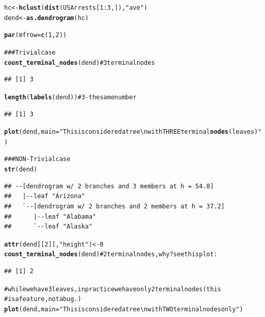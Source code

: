 \documentclass[shortnames,nojss,article]{jss}\usepackage{graphicx, color}
\makeatletter
\newcommand{\hlfunctioncall}[1]{\textcolor[rgb]{0.501960784313725,0,0.329411764705882}{\textbf{#1}}}%
\newcommand{\hlstring}[1]{\textcolor[rgb]{0.6,0.6,1}{#1}}%
\newcommand{\hlcomment}[1]{\textcolor[rgb]{0.180392156862745,0.6,0.341176470588235}{#1}}%
\newenvironment{kframe}{%
 \def\at@end@of@kframe{}%
 \ifinner\ifhmode%
  \def\at@end@of@kframe{\end{minipage}}%
  \begin{minipage}{\columnwidth}%
 \fi\fi%
 \def\FrameCommand##1{\hskip\@totalleftmargin \hskip-\fboxsep
 \colorbox{shadecolor}{##1}\hskip-\fboxsep
     \hskip-\linewidth \hskip-\@totalleftmargin \hskip\columnwidth}%
 \MakeFramed {\advance\hsize-\width
   \@totalleftmargin\z@ \linewidth\hsize
   \@setminipage}}%
 {\par\unskip\endMakeFramed%
 \at@end@of@kframe}
\newenvironment{knitrout}{}{} %
\makeatother
\begin{document}
\begin{knitrout}
\color{fgcolor}\begin{kframe}
\begin{alltt}

hc <- \hlfunctioncall{hclust}(\hlfunctioncall{dist}(USArrests[1:3, ]), \hlstring{"ave"})
dend <- \hlfunctioncall{as.dendrogram}(hc)

\hlfunctioncall{par}(mfrow = \hlfunctioncall{c}(1, 2))

\hlcomment{### Trivial case}
\hlfunctioncall{count_terminal_nodes}(dend)  \hlcomment{# 3 terminal nodes}
\end{alltt}
\begin{verbatim}
## [1] 3
\end{verbatim}
\begin{alltt}
\hlfunctioncall{length}(\hlfunctioncall{labels}(dend))  \hlcomment{# 3 - the same number}
\end{alltt}
\begin{verbatim}
## [1] 3
\end{verbatim}
\begin{alltt}
\hlfunctioncall{plot}(dend, main = \hlstring{"This is considered a tree \textbackslash{}n with THREE terminal \hlfunctioncall{nodes} (leaves)"})

\hlcomment{### NON-Trivial case}
\hlfunctioncall{str}(dend)
\end{alltt}
\begin{verbatim}
## --[dendrogram w/ 2 branches and 3 members at h = 54.8]
##   |--leaf "Arizona" 
##   `--[dendrogram w/ 2 branches and 2 members at h = 37.2]
##      |--leaf "Alabama" 
##      `--leaf "Alaska"
\end{verbatim}
\begin{alltt}
\hlfunctioncall{attr}(dend[[2]], \hlstring{"height"}) <- 0
\hlfunctioncall{count_terminal_nodes}(dend)  \hlcomment{# 2 terminal nodes, why? see this plot:}
\end{alltt}
\begin{verbatim}
## [1] 2
\end{verbatim}
\begin{alltt}
\hlcomment{# while we have 3 leaves, in practice we have only 2 terminal nodes (this}
\hlcomment{# is a feature, not a bug.)}
\hlfunctioncall{plot}(dend, main = \hlstring{"This is considered a tree \textbackslash{}n with TWO terminal nodes only"})
\end{alltt}
\end{kframe}


\end{knitrout}
\end{document}
